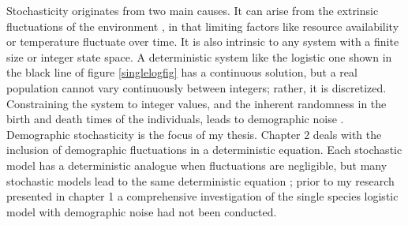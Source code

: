 Stochasticity originates from two main causes. 
It can arise from the extrinsic fluctuations of the environment \cite{Kamenev2008a,Chotibut2017a}, in that limiting factors like resource availability or temperature fluctuate over time. 
It is also intrinsic to any system with a finite size or integer state space. 
A deterministic system like the logistic one shown in the black line of figure \ref{singlelogfig} has a continuous solution, but a real population cannot vary continuously between integers; rather, it is discretized. %
Constraining the system to integer values, and the inherent randomness in the birth and death times of the individuals, leads to demographic noise \cite{Assaf2006,Gottesman2012,Dobrinevski2012,Gabel2013,Fisher2014,Constable2015,Lin2012,Chotibut2015,Young2018}. 
Demographic stochasticity is the focus of my thesis. 
Chapter 2 deals with the inclusion of demographic fluctuations in a deterministic equation. 
Each stochastic model has a deterministic analogue when fluctuations are negligible, but many stochastic models lead to the same deterministic equation \cite{Nisbet1982,Norden1982,Nasell2001,Rouzine2001,Gardiner2004}; prior to my research presented in chapter 1 a comprehensive investigation of the single species logistic model with demographic noise had not been conducted. %

